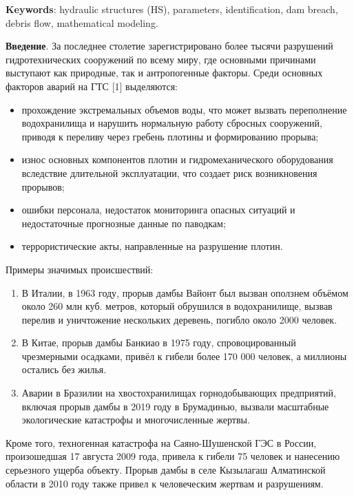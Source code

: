 {\bfseries Keywords}: hydraulic structures (HS), parameters,
identification, dam breach, debris flow, mathematical modeling.

{\bfseries Введение}. За последнее столетие зарегистрировано более тысячи
разрушений гидротехнических сооружений по всему миру, где основными
причинами выступают как природные, так и антропогенные факторы. Среди
основных факторов аварий на ГТС {[}1{]} выделяются:

\begin{itemize}
\item
  прохождение экстремальных объемов воды, что может вызвать переполнение
  водохранилища и нарушить нормальную работу сбросных сооружений,
  приводя к переливу через гребень плотины и формированию прорыва;
\item
  износ основных компонентов плотин и гидромеханического оборудования
  вследствие длительной эксплуатации, что создает риск возникновения
  прорывов;
\item
  ошибки персонала, недостаток мониторинга опасных ситуаций и
  недостаточные прогнозные данные по паводкам;
\item
  террористические акты, направленные на разрушение плотин.
\end{itemize}

Примеры значимых происшествий:

\begin{enumerate}
\def\labelenumi{\arabic{enumi}.}
\item
  В Италии, в 1963 году, прорыв дамбы Вайонт был вызван оползнем объёмом
  около 260 млн куб. метров, который обрушился в водохранилище, вызвав
  перелив и уничтожение нескольких деревень, погибло около 2000 человек.
\item
  В Китае, прорыв дамбы Банкиао в 1975 году, спровоцированный
  чрезмерными осадками, привёл к гибели более 170 000 человек, а
  миллионы остались без жилья.
\item
  Аварии в Бразилии на хвостохранилищах горнодобывающих предприятий,
  включая прорыв дамбы в 2019 году в Брумадинью, вызвали масштабные
  экологические катастрофы и многочисленные жертвы.
\end{enumerate}

Кроме того, техногенная катастрофа на Саяно-Шушенской ГЭС в России,
произошедшая 17 августа 2009 года, привела к гибели 75 человек и
нанесению серьезного ущерба объекту. Прорыв дамбы в селе Кызылагаш
Алматинской области в 2010 году также привел к человеческим жертвам и
разрушениям.

